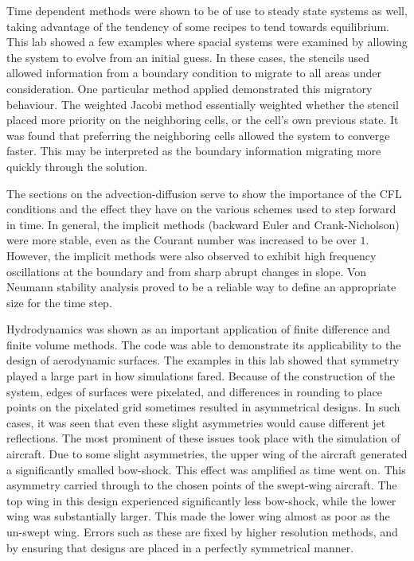 \documentclass[twocolumn]{article}
\begin{document}
Time dependent methods were shown to be of use to steady state systems as well, taking advantage of the tendency of some recipes to tend towards equilibrium. This lab showed a few examples where spacial systems were examined by allowing the system to evolve from an initial guess. In these cases, the stencils used allowed information from a boundary condition to migrate to all areas under consideration. One particular method applied demonstrated this migratory behaviour. The weighted Jacobi method essentially weighted whether the stencil placed more priority on the neighboring cells, or the cell's own previous state. It was found that preferring the neighboring cells allowed the system to converge faster. This may be interpreted as the boundary information migrating more quickly through the solution.

The sections on the advection-diffusion serve to show the importance
of the CFL conditions and the effect they have on the various schemes
used to step forward in time. In general, the implicit methods
(backward Euler and Crank-Nicholson) were more stable, even as the
Courant number was increased to be over $1$. However, the implicit
methods were also observed to exhibit high frequency oscillations at
the boundary and from sharp abrupt changes in slope. Von Neumann
stability analysis proved to be a reliable way to define an
appropriate size for the time step.

Hydrodynamics was shown as an important application of finite difference and finite volume methods. The code was able to demonstrate its applicability to the design of aerodynamic surfaces. The examples in this lab showed that symmetry played a large part in how simulations fared. Because of the construction of the system, edges of surfaces were pixelated, and differences in rounding to place points on the pixelated grid sometimes resulted in asymmetrical designs. In such cases, it was seen that even these slight asymmetries would cause different jet reflections. The most prominent of these issues took place with the simulation of aircraft. Due to some slight asymmetries, the upper wing of the aircraft generated a significantly smalled bow-shock. This effect was amplified as time went on. This asymmetry carried through to the chosen points of the swept-wing aircraft. The top wing in this design experienced significantly less bow-shock, while the lower wing was substantially larger. This made the lower wing almost as poor as the un-swept wing. Errors such as these are fixed by higher resolution methods, and by ensuring that designs are placed in a perfectly symmetrical manner.
\end{document}
